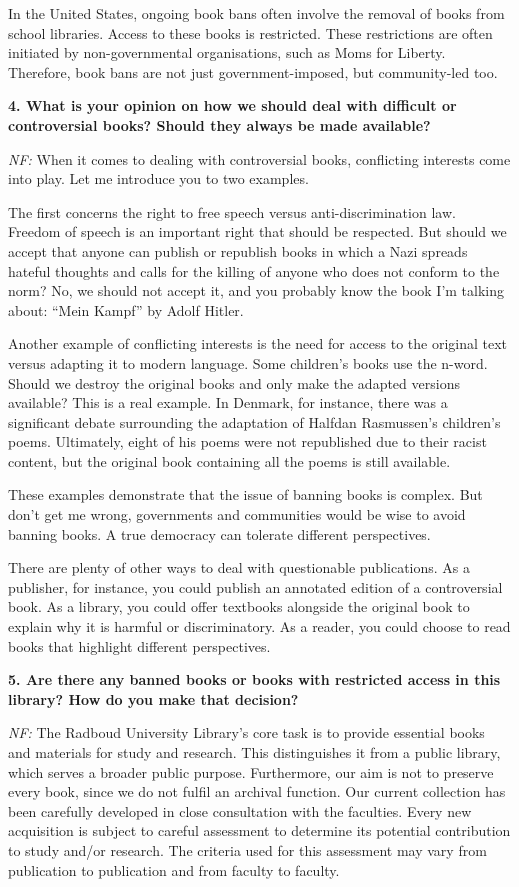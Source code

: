 \documentclass[a4paper,
fontsize=11pt,
oneside,
numbers=noperiodatend,
parskip=half-,
bibliography=totoc,
final
]{scrartcl}
\begin{document}
In the United States, ongoing book bans often involve the removal of
books from school libraries. Access to these books is restricted. These
restrictions are often initiated by non-governmental organisations, such
as Moms for Liberty. Therefore, book bans are not just
government-imposed, but community-led too.

\textbf{4. What is your opinion on how we should deal with difficult or
controversial books? Should they always be made available?}

\emph{NF:} When it comes to dealing with controversial books,
conflicting interests come into play. Let me introduce you to two
examples.

The first concerns the right to free speech versus anti-discrimination
law. Freedom of speech is an important right that should be respected.
But should we accept that anyone can publish or republish books in which
a Nazi spreads hateful thoughts and calls for the killing of anyone who
does not conform to the norm? No, we should not accept it, and you
probably know the book I'm talking about: \enquote{Mein
Kampf} by Adolf Hitler.

Another example of conflicting interests is the need for access to the
original text versus adapting it to modern language. Some
children's books use the n-word. Should we destroy the
original books and only make the adapted versions available? This is a
real example. In Denmark, for instance, there was a significant debate
surrounding the adaptation of Halfdan Rasmussen's
children's poems. Ultimately, eight of his poems were
not republished due to their racist content, but the original book
containing all the poems is still available.

These examples demonstrate that the issue of banning books is complex.
But don't get me wrong, governments and communities
would be wise to avoid banning books. A true democracy can tolerate
different perspectives.

There are plenty of other ways to deal with questionable publications.
As a publisher, for instance, you could publish an annotated edition of
a controversial book. As a library, you could offer textbooks alongside
the original book to explain why it is harmful or discriminatory. As a
reader, you could choose to read books that highlight different
perspectives.

\textbf{5. Are there any banned books or books with restricted access in
this library? How do you make that decision?}

\emph{NF:} The Radboud University Library's core task is
to provide essential books and materials for study and research. This
distinguishes it from a public library, which serves a broader public
purpose. Furthermore, our aim is not to preserve every book, since we do
not fulfil an archival function. Our current collection has been
carefully developed in close consultation with the faculties. Every new
acquisition is subject to careful assessment to determine its potential
contribution to study and/or research. The criteria used for this
assessment may vary from publication to publication and from faculty to
faculty.
\end{document}

